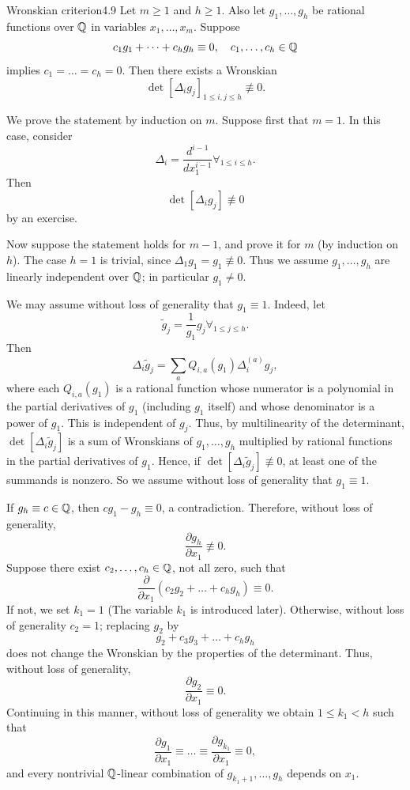 \documentclass{Vorlesungstemplate_English} %
\begin{document}
\begin{proposition}{Wronskian criterion}{4.9}
  Let $m \geq 1$ and $h \geq 1$. Also let $g_1,\dots,g_h$ be rational functions over $\mathbb{Q}$ in variables $x_1,\dots,x_m$. Suppose
  \[
    c_1g_1+\dots+c_hg_h \equiv 0, \quad c_1,\dots,c_h \in \mathbb{Q}
  \]
  implies $c_1=\dots=c_h=0$. Then there exists a Wronskian
  \[
    \det\left[\Delta_i g_j\right]_{1 \leq i,j \leq h}\not\equiv 0.
  \]
\end{proposition}
\begin{pf}
  We prove the statement by induction on $m$. Suppose first that $m=1$. In this case, consider
  \[
    \Delta_i=\frac{d^{i-1}}{dx_1^{i-1}} \forall_{1 \leq i \leq h}.
  \]
  Then
  \[
    \det\left[\Delta_i g_j\right]\not\equiv 0
  \]
  by an exercise.

  Now suppose the statement holds for $m-1$, and prove it for $m$ (by induction on $h$). The case $h=1$ is trivial, since $\Delta_1g_1=g_1\not\equiv 0$. Thus we assume $g_1,\dots,g_h$ are linearly independent over $\mathbb{Q}$; in particular $g_1\neq 0$.

  We may assume without loss of generality that $g_1\equiv 1$. Indeed, let
  \[
    \widetilde g_j=\frac{1}{g_1}g_j \forall_{1 \leq j \leq h}.
  \]
  Then
  \[
    \Delta_i\widetilde g_j=\sum_a Q_{i,a}(g_1)\Delta_i^{(a)}g_j,
  \]
  where each $Q_{i,a}(g_1)$ is a rational function whose numerator is a polynomial in the partial derivatives of $g_1$ (including $g_1$ itself) and whose denominator is a power of $g_1$. This is independent of $g_j$. Thus, by multilinearity of the determinant, $\det[\Delta_i\widetilde g_j]$ is a sum of Wronskians of $g_1,\dots,g_h$ multiplied by rational functions in the partial derivatives of $g_1$. Hence, if $\det[\Delta_i\widetilde g_j]\not\equiv 0$, at least one of the summands is nonzero. So we assume without loss of generality that $g_1\equiv 1$.

  If $g_h\equiv c \in \mathbb{Q}$, then $cg_1-g_h\equiv 0$, a contradiction. Therefore, without loss of generality,
  \[
    \frac{\partial g_h}{\partial x_1}\not\equiv 0.
  \]
  Suppose there exist $c_2,\dots,c_h\in\mathbb{Q}$, not all zero, such that
  \[
    \frac{\partial}{\partial x_1}(c_2g_2+\dots+c_hg_h)\equiv 0.
  \]
  If not, we set $k_1=1$ {\color{blue} (The variable $k_1$ is introduced later)}. Otherwise, without loss of generality $c_2=1$; replacing $g_2$ by
  \[
    g_2+c_3g_3+\dots+c_hg_h
  \]
  does not change the Wronskian by the properties of the determinant. Thus, without loss of generality,
  \[
    \frac{\partial g_2}{\partial x_1}\equiv 0.
  \]
  Continuing in this manner, without loss of generality we obtain $1 \leq k_1<h$ such that
  \[
    \frac{\partial g_1}{\partial x_1}\equiv \dots \equiv \frac{\partial g_{k_1}}{\partial x_1}\equiv 0,
  \]
  and every nontrivial $\mathbb{Q}$-linear combination of $g_{k_1+1},\dots,g_h$ depends on $x_1$.


\end{pf}
\end{document}
